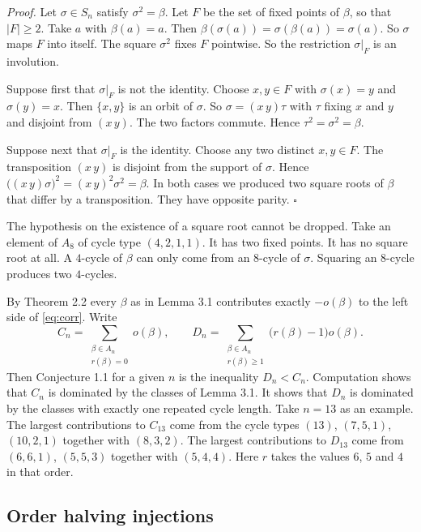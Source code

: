 \documentclass[10pt]{article}
\begin{document}
\medskip\noindent
\textit{Proof.} Let $\sigma\in S_n$ satisfy $\sigma^{2}=\beta$. Let $F$ be the set of fixed
points of $\beta$, so that $|F|\ge2$. Take $a$ with $\beta(a)=a$. Then
$\beta(\sigma(a))=\sigma(\beta(a))=\sigma(a)$. So $\sigma$ maps $F$ into itself. The square
$\sigma^{2}$ fixes $F$ pointwise. So the restriction $\sigma|_F$ is an involution.

Suppose first that $\sigma|_F$ is not the identity. Choose $x,y\in F$ with $\sigma(x)=y$
and $\sigma(y)=x$. Then $\{x,y\}$ is an orbit of $\sigma$. So $\sigma=(x\,y)\tau$ with
$\tau$ fixing $x$ and $y$ and disjoint from $(x\,y)$. The two factors commute. Hence
$\tau^{2}=\sigma^{2}=\beta$.

Suppose next that $\sigma|_F$ is the identity. Choose any two distinct $x,y\in F$. The
transposition $(x\,y)$ is disjoint from the support of $\sigma$. Hence
$\bigl((x\,y)\sigma\bigr)^{2}=(x\,y)^{2}\sigma^{2}=\beta$. In both cases we produced two
square roots of $\beta$ that differ by a transposition. They have opposite parity. $\square$

\medskip
The hypothesis on the existence of a square root cannot be dropped. Take an element of $A_8$
of cycle type $(4,2,1,1)$. It has two fixed points. It has no square root at all. A
$4$-cycle of $\beta$ can only come from an $8$-cycle of $\sigma$. Squaring an $8$-cycle
produces two $4$-cycles.

By Theorem 2.2 every $\beta$ as in Lemma 3.1 contributes exactly $-o(\beta)$ to the left
side of \eqref{eq:corr}. Write
\begin{equation}\label{eq:creditdebit}
  C_n=\sum_{\substack{\beta\in A_n\\ r(\beta)=0}}o(\beta),
  \qquad
  D_n=\sum_{\substack{\beta\in A_n\\ r(\beta)\ge1}}\bigl(r(\beta)-1\bigr)o(\beta).
\end{equation}
Then Conjecture 1.1 for a given $n$ is the inequality $D_n<C_n$. Computation shows that
$C_n$ is dominated by the classes of Lemma 3.1. It shows that $D_n$ is dominated by the
classes with exactly one repeated cycle length. Take $n=13$ as an example. The largest
contributions to $C_{13}$ come from the cycle types $(13)$, $(7,5,1)$, $(10,2,1)$ together
with $(8,3,2)$. The largest contributions to $D_{13}$ come from $(6,6,1)$, $(5,5,3)$
together with $(5,4,4)$. Here $r$ takes the values $6$, $5$ and $4$ in that order.

\subsection*{Order halving injections}
\end{document}

